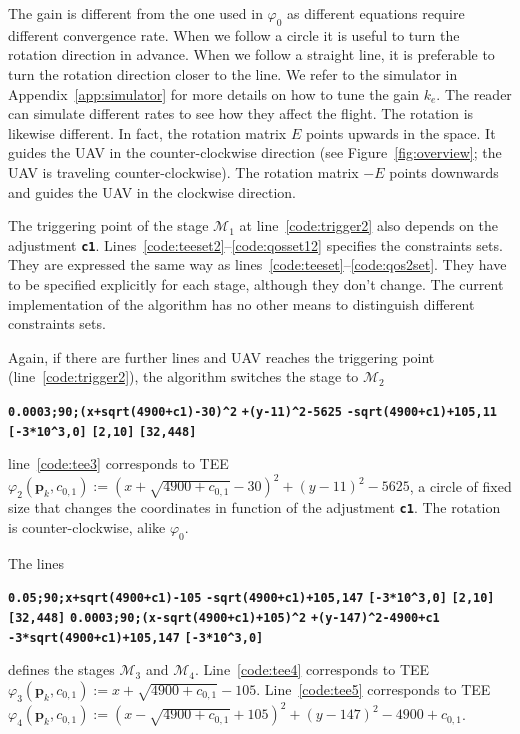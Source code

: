 \documentclass[letterpaper,10pt,conference]{ieeeconf}
\theoremstyle{definition}
\begin{document}
The gain is different from the one used in $\varphi_0$ as different equations require different convergence rate. When we follow a circle it is useful to turn the rotation direction in advance. When we follow a straight line, it is preferable to turn the rotation direction closer to the line. We refer to the simulator in Appendix~\ref{app:simulator} for more details on how to tune the gain $k_e$. The reader can simulate different rates to see how they affect the flight. The rotation is likewise different. In fact, the rotation matrix $E$ points upwards in the space. It guides the UAV in the counter-clockwise direction (see Figure~\ref{fig:overview}; the UAV is traveling counter-clockwise). The rotation matrix $-E$ points downwards and guides the UAV in the clockwise direction.

The triggering point of the stage $\mathcal{M}_1$ at line~\ref{code:trigger2} also depends on the adjustment {\tt\textbf{c1}}. Lines~\ref{code:teeset2}--\ref{code:qosset12} specifies the constraints sets. They are expressed the same way as lines~\ref{code:teeset}--\ref{code:qos2set}. They have to be specified explicitly for each stage, although they don't change. The current implementation of the algorithm has no other means to distinguish different constraints sets. 

Again, if there are further lines and UAV reaches the triggering point (line~\ref{code:trigger2}), the algorithm switches the stage to $\mathcal{M}_2$
\begin{algorithmic}[1]
  \State\textbf{\texttt{0.0003;90;(x+sqrt(4900+c1)-30)\^{}2}}
  \textbf{\texttt{\hspace*{14ex}+(y-11)\^{}2-5625}}\label{code:tee3}
  \State\textbf{\texttt{-sqrt(4900+c1)+105,11}}
  \State\textbf{\texttt{[-3*10\^{}3,0]}}
  \State\textbf{\texttt{[2,10]}}
  \State\textbf{\texttt{[32,448]}}\label{code:qosset32}
\end{algorithmic}
line~\ref{code:tee3} corresponds to TEE $\varphi_2(\mathbf{p}_k,c_{0,1}):=(x+\sqrt{4900+c_{0,1}}-30)^2+(y-11)^2-5625$, a circle of fixed size that changes the coordinates in function of the adjustment {\tt\textbf{c1}}. The rotation is counter-clockwise, alike $\varphi_0$.

The lines
\begin{algorithmic}[1]
  \State\textbf{\texttt{0.05;90;x+sqrt(4900+c1)-105}}\label{code:tee4}
  \State\textbf{\texttt{-sqrt(4900+c1)+105,147}}
  \State\textbf{\texttt{[-3*10\^{}3,0]}}
  \State\textbf{\texttt{[2,10]}}
  \State\textbf{\texttt{[32,448]}}\label{code:qosset42}
  \State\textbf{\texttt{0.0003;90;(x-sqrt(4900+c1)+105)\^{}2}}
  \textbf{\texttt{\hspace*{14ex}+(y-147)\^{}2-4900+c1}}\label{code:tee5}
  \State\textbf{\texttt{-3*sqrt(4900+c1)+105,147}}\label{code:triggerlast}
  \State\textbf{\texttt{[-3*10\^{}3,0]}}\label{code:teeset5}
\end{algorithmic}
defines the stages $\mathcal{M}_3$ and $\mathcal{M}_4$. Line~\ref{code:tee4} corresponds to TEE $\varphi_3(\mathbf{p}_k,c_{0,1}):=x+\sqrt{4900+c_{0,1}}-105$. Line~\ref{code:tee5} corresponds to TEE $\varphi_4(\mathbf{p}_k,c_{0,1}):=(x-\sqrt{4900+c_{0,1}}+105)^2+(y-147)^2-4900+c_{0,1}$.
\end{document}
